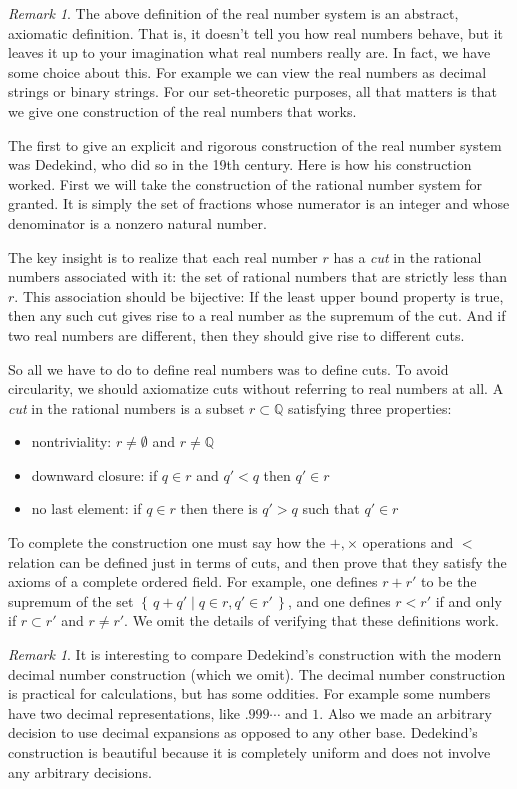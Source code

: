 \documentclass[11pt,oneside]{amsbook}
\newcommand{\set}[1]{\left\{\,#1\,\right\}}
\newcommand{\QQ}{\mathbb Q}
\theoremstyle{definition}
\theoremstyle{plain}
\theoremstyle{definition}
\theoremstyle{remark}
\newtheorem{rem}[thm]{Remark}
\numberwithin{equation}{section}
\numberwithin{figure}{section}
\begin{document}
\begin{rem}
  The above definition of the real number system is an abstract, axiomatic definition. That is, it doesn't tell you how real numbers behave, but it leaves it up to your imagination what real numbers really are. In fact, we have some choice about this. For example we can view the real numbers as decimal strings or binary strings. For our set-theoretic purposes, all that matters is that we give one construction of the real numbers that works.
\end{rem}

The first to give an explicit and rigorous construction of the real number system was Dedekind, who did so in the 19th century. Here is how his construction worked. First we will take the construction of the rational number system for granted. It is simply the set of fractions whose numerator is an integer and whose denominator is a nonzero natural number.

The key insight is to realize that each real number $r$ has a \emph{cut} in the rational numbers associated with it: the set of rational numbers that are strictly less than $r$. This association should be bijective: If the least upper bound property is true, then any such cut gives rise to a real number as the supremum of the cut. And if two real numbers are different, then they should give rise to different cuts.

So all we have to do to define real numbers was to define cuts. To avoid circularity, we should axiomatize cuts without referring to real numbers at all. A \emph{cut} in the rational numbers is a subset $r\subset\QQ$ satisfying three properties:
\begin{itemize}
\item nontriviality: $r\neq\emptyset$ and $r\neq\QQ$
\item downward closure: if $q\in r$ and $q'<q$ then $q'\in r$
\item no last element: if $q\in r$ then there is $q'>q$ such that $q'\in r$
\end{itemize}
To complete the construction one must say how the $+,\times$ operations and $<$ relation can be defined just in terms of cuts, and then prove that they satisfy the axioms of a complete ordered field. For example, one defines $r+r'$ to be the supremum of the set $\set{q+q'\mid q\in r,q'\in r'}$, and one defines $r<r'$ if and only if $r\subset r'$ and $r\neq r'$. We omit the details of verifying that these definitions work.

\begin{rem}
  It is interesting to compare Dedekind's construction with the modern decimal number construction (which we omit). The decimal number construction is practical for calculations, but has some oddities. For example some numbers have two decimal representations, like $.999\cdots$ and $1$. Also we made an arbitrary decision to use decimal expansions as opposed to any other base. Dedekind's construction is beautiful because it is completely uniform and does not involve any arbitrary decisions.
\end{rem}
\end{document}

